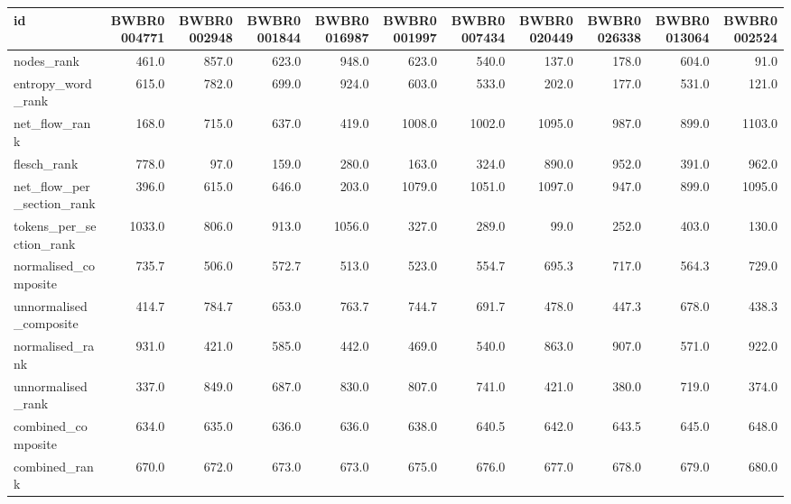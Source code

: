 \begin{tabular}{lrrrrrrrrrr}
\toprule
id & BWBR0004771 & BWBR0002948 & BWBR0001844 & BWBR0016987 & BWBR0001997 & BWBR0007434 & BWBR0020449 & BWBR0026338 & BWBR0013064 & BWBR0002524 \\
\midrule
nodes\_rank & 461.0 & 857.0 & 623.0 & 948.0 & 623.0 & 540.0 & 137.0 & 178.0 & 604.0 & 91.0 \\
\cline{1-11}
entropy\_word\_rank & 615.0 & 782.0 & 699.0 & 924.0 & 603.0 & 533.0 & 202.0 & 177.0 & 531.0 & 121.0 \\
\cline{1-11}
net\_flow\_rank & 168.0 & 715.0 & 637.0 & 419.0 & 1008.0 & 1002.0 & 1095.0 & 987.0 & 899.0 & 1103.0 \\
\cline{1-11}
flesch\_rank & 778.0 & 97.0 & 159.0 & 280.0 & 163.0 & 324.0 & 890.0 & 952.0 & 391.0 & 962.0 \\
\cline{1-11}
net\_flow\_per\_section\_rank & 396.0 & 615.0 & 646.0 & 203.0 & 1079.0 & 1051.0 & 1097.0 & 947.0 & 899.0 & 1095.0 \\
\cline{1-11}
tokens\_per\_section\_rank & 1033.0 & 806.0 & 913.0 & 1056.0 & 327.0 & 289.0 & 99.0 & 252.0 & 403.0 & 130.0 \\
\cline{1-11}
normalised\_composite & 735.7 & 506.0 & 572.7 & 513.0 & 523.0 & 554.7 & 695.3 & 717.0 & 564.3 & 729.0 \\
\cline{1-11}
unnormalised\_composite & 414.7 & 784.7 & 653.0 & 763.7 & 744.7 & 691.7 & 478.0 & 447.3 & 678.0 & 438.3 \\
\cline{1-11}
normalised\_rank & 931.0 & 421.0 & 585.0 & 442.0 & 469.0 & 540.0 & 863.0 & 907.0 & 571.0 & 922.0 \\
\cline{1-11}
unnormalised\_rank & 337.0 & 849.0 & 687.0 & 830.0 & 807.0 & 741.0 & 421.0 & 380.0 & 719.0 & 374.0 \\
\cline{1-11}
combined\_composite & 634.0 & 635.0 & 636.0 & 636.0 & 638.0 & 640.5 & 642.0 & 643.5 & 645.0 & 648.0 \\
\cline{1-11}
combined\_rank & 670.0 & 672.0 & 673.0 & 673.0 & 675.0 & 676.0 & 677.0 & 678.0 & 679.0 & 680.0 \\
\cline{1-11}
\bottomrule
\end{tabular}
